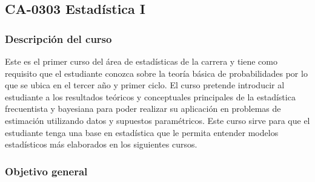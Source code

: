 \newpage
\subsection*{CA-0303 Estadística I}

\hypertarget{CA0303}{}
\begin{refsection}
\begin{table}[H]
\end{table}

\subsubsection*{Descripción del curso}

Este es el primer curso del área de estadísticas de la carrera y tiene como requisito que el estudiante conozca sobre la teoría básica de probabilidades por lo que se ubica en el tercer año y primer ciclo. El curso pretende introducir al estudiante a los resultados teóricos y conceptuales principales de la estadística frecuentista y bayesiana para poder realizar su aplicación en problemas de estimación utilizando datos y supuestos paramétricos. Este curso sirve para que el estudiante tenga una base en estadística que le permita entender modelos estadísticos más elaborados en los siguientes cursos.

\subsubsection*{Objetivo general}


\end{refsection}
